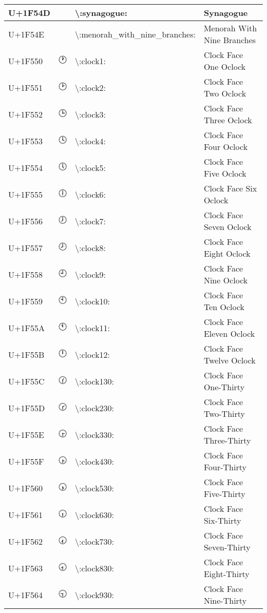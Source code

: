 \begin{table}[h]
\begin{tabulary}{\linewidth}{|L|L|L|L|}
U+1F54D & 🕍 & {\textbackslash}:synagogue: & Synagogue \\
\hline
U+1F54E & 🕎 & {\textbackslash}:menorah\_with\_nine\_branches: & Menorah With Nine Branches \\
\hline
U+1F550 & 🕐 & {\textbackslash}:clock1: & Clock Face One Oclock \\
\hline
U+1F551 & 🕑 & {\textbackslash}:clock2: & Clock Face Two Oclock \\
\hline
U+1F552 & 🕒 & {\textbackslash}:clock3: & Clock Face Three Oclock \\
\hline
U+1F553 & 🕓 & {\textbackslash}:clock4: & Clock Face Four Oclock \\
\hline
U+1F554 & 🕔 & {\textbackslash}:clock5: & Clock Face Five Oclock \\
\hline
U+1F555 & 🕕 & {\textbackslash}:clock6: & Clock Face Six Oclock \\
\hline
U+1F556 & 🕖 & {\textbackslash}:clock7: & Clock Face Seven Oclock \\
\hline
U+1F557 & 🕗 & {\textbackslash}:clock8: & Clock Face Eight Oclock \\
\hline
U+1F558 & 🕘 & {\textbackslash}:clock9: & Clock Face Nine Oclock \\
\hline
U+1F559 & 🕙 & {\textbackslash}:clock10: & Clock Face Ten Oclock \\
\hline
U+1F55A & 🕚 & {\textbackslash}:clock11: & Clock Face Eleven Oclock \\
\hline
U+1F55B & 🕛 & {\textbackslash}:clock12: & Clock Face Twelve Oclock \\
\hline
U+1F55C & 🕜 & {\textbackslash}:clock130: & Clock Face One-Thirty \\
\hline
U+1F55D & 🕝 & {\textbackslash}:clock230: & Clock Face Two-Thirty \\
\hline
U+1F55E & 🕞 & {\textbackslash}:clock330: & Clock Face Three-Thirty \\
\hline
U+1F55F & 🕟 & {\textbackslash}:clock430: & Clock Face Four-Thirty \\
\hline
U+1F560 & 🕠 & {\textbackslash}:clock530: & Clock Face Five-Thirty \\
\hline
U+1F561 & 🕡 & {\textbackslash}:clock630: & Clock Face Six-Thirty \\
\hline
U+1F562 & 🕢 & {\textbackslash}:clock730: & Clock Face Seven-Thirty \\
\hline
U+1F563 & 🕣 & {\textbackslash}:clock830: & Clock Face Eight-Thirty \\
\hline
U+1F564 & 🕤 & {\textbackslash}:clock930: & Clock Face Nine-Thirty \\

\end{tabulary}
\end{table}
